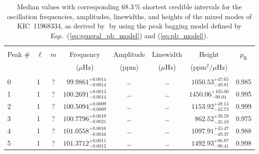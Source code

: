\begin{table*}[!]
\caption{Median values with corresponding 68.3\,\% shortest credible intervals for the oscillation frequencies, amplitudes, linewidths, and heights of the mixed modes of KIC~11968334, as derived by \diamonds\,\,by using the peak bagging model defined by Eqs.~(\ref{eq:general_pb_model}) and (\ref{eq:pb_model}).}
\label{tab:11968334m}
\centering
\begin{tabular}{llcrrlrc}
\hline\hline
\\[-8pt]      
Peak \# & $\ell$ & $m$ & \multicolumn{1}{c}{Frequency} & \multicolumn{1}{c}{Amplitude} & \multicolumn{1}{c}{Linewidth} & \multicolumn{1}{c}{Height}& $p_\mathrm{B}$\\
 & & & \multicolumn{1}{c}{($\mu$Hz)} & \multicolumn{1}{c}{(ppm)} & \multicolumn{1}{c}{($\mu$Hz)} & \multicolumn{1}{c}{(ppm$^2/\mu$Hz)}\\
\hline \\[-8pt]
0 & 1 & ? & $     99.9861_{-      0.0014}^{+      0.0014}$ & \multicolumn{1}{c}{\dots} & \multicolumn{1}{c}{\dots} & $     1050.53_{-       49.81}^{+       47.65}$ & 0.985\\[1pt]
1 & 1 & ? & $    100.2691_{-      0.0014}^{+      0.0013}$ & \multicolumn{1}{c}{\dots} & \multicolumn{1}{c}{\dots} & $     1450.06_{-       90.04}^{+      105.00}$ & 0.995 \\[1pt]
2 & 1 & ? & $    100.5094_{-      0.0009}^{+      0.0009}$ & \multicolumn{1}{c}{\dots} & \multicolumn{1}{c}{\dots} & $     1153.92_{-       42.73}^{+       48.14}$ & 0.999\\[1pt]
3 & 1 & ? & $    100.7796_{-      0.0021}^{+      0.0019}$ & \multicolumn{1}{c}{\dots} & \multicolumn{1}{c}{\dots} & $      862.52_{-       35.19}^{+       39.59}$ & 0.975\\[1pt]
4 & 1 & ? & $    101.0558_{-      0.0016}^{+      0.0016}$ & \multicolumn{1}{c}{\dots} & \multicolumn{1}{c}{\dots} & $     1097.91_{-       49.37}^{+       45.47}$ & 0.988\\[1pt]
5 & 1 & ? & $    101.3712_{-      0.0012}^{+      0.0011}$ & \multicolumn{1}{c}{\dots} & \multicolumn{1}{c}{\dots} & $     1492.93_{-       90.41}^{+       86.87}$ & 0.998\\[1pt]


\end{tabular}
\end{table*}
